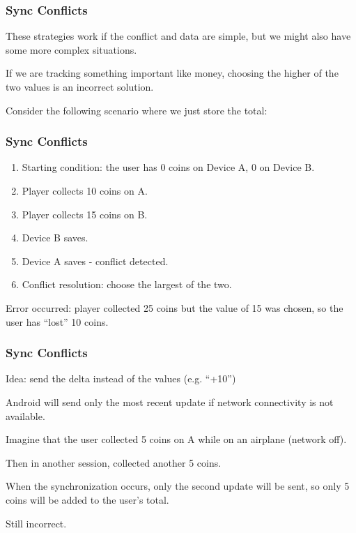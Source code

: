 \begin{frame}
\frametitle{Sync Conflicts}
\begin{changemargin}{1cm}
These strategies work if the conflict and data are simple, but we might also have some more complex situations. 

If we are tracking something important like money, choosing the higher of the two values is an incorrect solution. 

Consider the following scenario where we just store the total:

\end{changemargin}
\end{frame}

\begin{frame}
\frametitle{Sync Conflicts}
\begin{changemargin}{1cm}

\begin{enumerate}
	\item Starting condition: the user has 0 coins on Device A, 0 on Device B.
	\item Player collects 10 coins on A.
	\item Player collects 15 coins on B.
	\item Device B saves.
	\item Device A saves - conflict detected.
	\item Conflict resolution: choose the largest of the two.
\end{enumerate}
Error occurred: player collected 25 coins but the value of 15 was chosen, so the user has ``lost'' 10 coins.

\end{changemargin}
\end{frame}

\begin{frame}
\frametitle{Sync Conflicts}
\begin{changemargin}{1cm}

Idea: send the delta instead of the values (e.g. ``+10'')

Android will send only the most recent update if network connectivity is not available. 

Imagine that the user collected 5 coins on A while on an airplane (network off).

Then in another session, collected another 5 coins. 

When the synchronization occurs, only the second update will be sent, so only 5 coins will be added to the user's total. 

Still incorrect.

\end{changemargin}
\end{frame}

